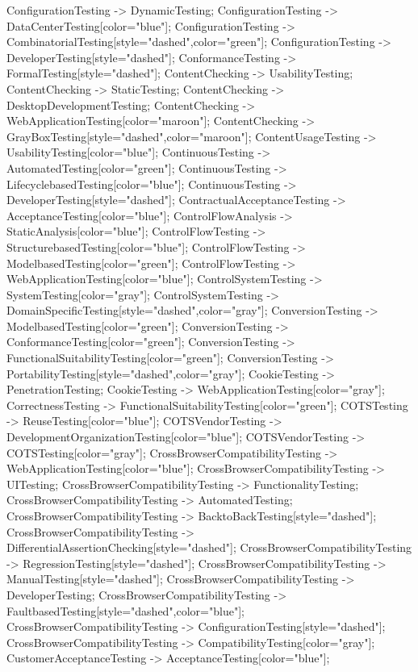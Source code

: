 \documentclass{article}
\begin{document}
{ConfigurationTesting -> DynamicTesting;
ConfigurationTesting -> DataCenterTesting[color="blue"];
ConfigurationTesting -> CombinatorialTesting[style="dashed",color="green"];
ConfigurationTesting -> DeveloperTesting[style="dashed"];
ConformanceTesting -> FormalTesting[style="dashed"];
ContentChecking -> UsabilityTesting;
ContentChecking -> StaticTesting;
ContentChecking -> DesktopDevelopmentTesting;
ContentChecking -> WebApplicationTesting[color="maroon"];
ContentChecking -> GrayBoxTesting[style="dashed",color="maroon"];
ContentUsageTesting -> UsabilityTesting[color="blue"];
ContinuousTesting -> AutomatedTesting[color="green"];
ContinuousTesting -> LifecyclebasedTesting[color="blue"];
ContinuousTesting -> DeveloperTesting[style="dashed"];
ContractualAcceptanceTesting -> AcceptanceTesting[color="blue"];
ControlFlowAnalysis -> StaticAnalysis[color="blue"];
ControlFlowTesting -> StructurebasedTesting[color="blue"];
ControlFlowTesting -> ModelbasedTesting[color="green"];
ControlFlowTesting -> WebApplicationTesting[color="blue"];
ControlSystemTesting -> SystemTesting[color="gray"];
ControlSystemTesting -> DomainSpecificTesting[style="dashed",color="gray"];
ConversionTesting -> ModelbasedTesting[color="green"];
ConversionTesting -> ConformanceTesting[color="green"];
ConversionTesting -> FunctionalSuitabilityTesting[color="green"];
ConversionTesting -> PortabilityTesting[style="dashed",color="gray"];
CookieTesting -> PenetrationTesting;
CookieTesting -> WebApplicationTesting[color="gray"];
CorrectnessTesting -> FunctionalSuitabilityTesting[color="green"];
COTSTesting -> ReuseTesting[color="blue"];
COTSVendorTesting -> DevelopmentOrganizationTesting[color="blue"];
COTSVendorTesting -> COTSTesting[color="gray"];
CrossBrowserCompatibilityTesting -> WebApplicationTesting[color="blue"];
CrossBrowserCompatibilityTesting -> UITesting;
CrossBrowserCompatibilityTesting -> FunctionalityTesting;
CrossBrowserCompatibilityTesting -> AutomatedTesting;
CrossBrowserCompatibilityTesting -> BacktoBackTesting[style="dashed"];
CrossBrowserCompatibilityTesting -> DifferentialAssertionChecking[style="dashed"];
CrossBrowserCompatibilityTesting -> RegressionTesting[style="dashed"];
CrossBrowserCompatibilityTesting -> ManualTesting[style="dashed"];
CrossBrowserCompatibilityTesting -> DeveloperTesting;
CrossBrowserCompatibilityTesting -> FaultbasedTesting[style="dashed",color="blue"];
CrossBrowserCompatibilityTesting -> ConfigurationTesting[style="dashed"];
CrossBrowserCompatibilityTesting -> CompatibilityTesting[color="gray"];
CustomerAcceptanceTesting -> AcceptanceTesting[color="blue"];
}
\end{document}
